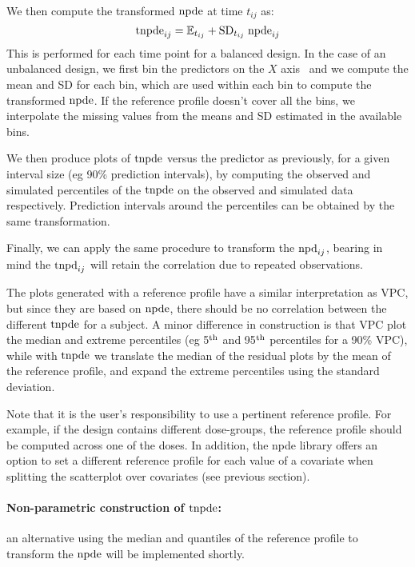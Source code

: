 We then compute the transformed ${\rm npde}$ at time $t_{ij}$ as:
\begin{equation}
{\rm tnpde}_{ij} = \mathbb{E}_{t_{ij}} + {\rm SD}_{t_{ij}} \; {\rm npde}_{ij}
\end{equation}
This is performed for each time point for a balanced design. In the case of an unbalanced design, we first bin the predictors on the $X$ axis~\cite{Lavielle11} and we compute the mean and SD for each bin, which are used within each bin to compute the transformed ${\rm npde}$. If the reference profile doesn't cover all the bins, we interpolate the missing values from the means and SD estimated in the available bins. 

We then produce plots of ${\rm tnpde}$ versus the predictor as previously, for a given interval size (eg 90\% prediction intervals), by computing the observed and simulated percentiles of the ${\rm tnpde}$ on the observed and simulated data respectively. Prediction intervals around the percentiles can be obtained by the same transformation.

Finally, we can apply the same procedure to transform the ${\rm npd}_{ij}$, bearing in mind the ${\rm tnpd}_{ij}$ will retain the correlation due to repeated observations.

The plots generated with a reference profile have a similar interpretation as VPC, but since they are based on ${\rm npde}$, there should be no correlation between the different ${\rm tnpde}$ for a subject.
A minor difference in construction is that VPC plot the median and extreme percentiles (eg 5$^{\rm th}$ and 95$^{\rm th}$ percentiles for a 90\% VPC), while with ${\rm tnpde}$ we translate the median of the residual plots by the mean of the reference profile, and expand the extreme percentiles using the standard deviation. 

Note that it is the user's responsibility to use a pertinent reference profile. For example, if the design contains different dose-groups, the reference profile should be computed across one of the doses. In addition, the {\sf npde} library offers an option to set a different reference profile for each value of a covariate when splitting the scatterplot over covariates (see previous section).


\paragraph{Non-parametric construction of ${\rm tnpde}$:} an alternative using the median and quantiles of the reference profile to transform the ${\rm npde}$ will be implemented shortly.

